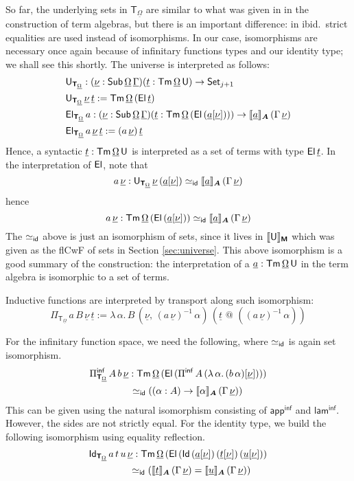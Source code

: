 \documentclass[sigplan,review,anonymous]{acmart}\settopmatter{printfolios=true,printccs=false,printacmref=false}
\makeatletter
\newcommand{\Pii}{\Pi}
\newcommand{\Piinf}{\Pi^{\mathsf{inf}}}
\newcommand{\appinf}{\mathsf{app^{inf}}}
\newcommand{\laminf}{\mathsf{lam^{inf}}}
\newcommand{\appitt}{\mathop{{\scriptstyle @}}}
\newcommand{\bA}{\boldsymbol{A}}
\newcommand{\bM}{\boldsymbol{\mathsf{M}}}
\newcommand{\bT}{\boldsymbol{\mathsf{T}}}
\newcommand{\ul}[1]{\underline{#1}}
\newcommand{\ulGamma}{\ul{\Gamma}}
\newcommand{\ulOmega}{\ul{\Omega}}
\newcommand{\ulnu}{\ul{\nu}}
\newcommand{\ult}{\ul{t}}
\newcommand{\ulu}{\ul{u}}
\newcommand{\ula}{\ul{a}}
\newcommand{\llb}{\llbracket}
\newcommand{\rrb}{\rrbracket}
\makeatother
\begin{document}
\begin{definition}
So far, the underlying sets in $\bT_{\ulOmega}$ are similar to what was given in
\cite{kaposi2019constructing} in the construction of term algebras, but there is
an important difference: in ibid.\ strict equalities are used instead of
isomorphisms. In our case, isomorphisms are necessary once again because of
infinitary functions types and our identity type; we shall see this shortly. The
universe is interpreted as follows:
\begin{alignat*}{3}
  & \U_{\bT_{\ulOmega}} : (\ulnu : \Sub\,\ulOmega\,\ulGamma)(\ult : \Tm\,\ulOmega\,\U)\ra
              \Set_{j+1}\\
  & \U_{\bT_{\ulOmega}}\,\ulnu\,\ult := \Tm\,\ulOmega\,(\El\,\ult)\\
  & \El_{\bT_{\ulOmega}}\,a : (\ulnu : \Sub\,\ulOmega\,\ulGamma)
             (\ult : \Tm\,\ulOmega\,(\El\,(\ula[\ulnu])))\ra
              \llb\ula\rrb_{\bA}\,(\Gamma\,\ulnu)\\
  & \El_{\bT_{\ulOmega}}\,a\,\ulnu\,\ult := (a\,\ulnu)\,\ult
\end{alignat*}
Hence, a syntactic $\ult : \Tm\,\ulOmega\,\U$ is interpreted as a set of terms
with type $\El\,\ult$. In the interpretation of $\mathsf{El}$, note that
\[
  a\,\ulnu : \U_{\bT_{\ulOmega}}\,\ulnu\,(\ula[\ulnu]) \simeq_{\id}
                 \llb\ula\rrb_{\bA}\,(\Gamma\,\ulnu)
\]
hence
\[
a\,\ulnu : \Tm\,\ulOmega\,(\El\,(\ula[\ulnu])) \simeq_{\id}
           \llb\ula\rrb_{\bA}\,(\Gamma\,\ulnu)
\]
The $\simeq_{\mathsf{id}}$ above is just an isomorphism of sets, since it lives in
$\llb\U\rrb_{\bM}$ which was given as the flCwF of sets in Section
\ref{sec:universe}. This above isomorphism is a good summary of the
construction: the interpretation of a $\ula : \Tm\,\ulOmega\,\U$ in the term
algebra is isomorphic to a set of terms.

Inductive functions are interpreted by transport along such isomorphism:
\[
  \Pii_{\bT_{\ulOmega}}\,a\,B\,\ulnu\,\ult := \lambda\,\alpha.\,
         B\,(\ulnu,\,(a\,\ulnu)^{-1}\,\alpha)\,(\ult\,\appitt\,((a\,\ulnu)^{-1}\,\alpha))
\]

For the infinitary function space, we need the following, where $\simeq_{\mathsf{id}}$ is
again set isomorphism.
\begin{alignat*}{3}
  & \Piinf_{\bT_{\ulOmega}}\,A\,b\,\ulnu : \Tm\,\ulOmega\,(\El\,(\Piinf\,A\,(\lambda\,\alpha.\,(b\,\alpha)[\ulnu])))\\
  & \hspace{4.2em}\simeq_{\id} ((\alpha : A) \ra \llb\alpha\rrb_{\bA}\,(\Gamma\,\ulnu))
\end{alignat*}
This can be given using the natural isomorphism consisting of $\appinf$ and
$\laminf$. However, the sides are not strictly equal. For the identity type, we
build the following isomorphism using equality reflection.
\begin{alignat*}{3}
  & \Id_{\bT_{\ulOmega}}\,a\,t\,u\,\ulnu : \Tm\,\ulOmega\,(\El\,(\Id\,(\ula[\ulnu])\,(\ult[\ulnu])\,(\ulu[\ulnu]))\\
  & \hspace{4.2em}\simeq_{\id} (\llb\ult\rrb_{\bA}\,(\Gamma\,\ulnu) =   \llb\ulu\rrb_{\bA}\,(\Gamma\,\ulnu))
\end{alignat*}


\end{definition}
\end{document}
